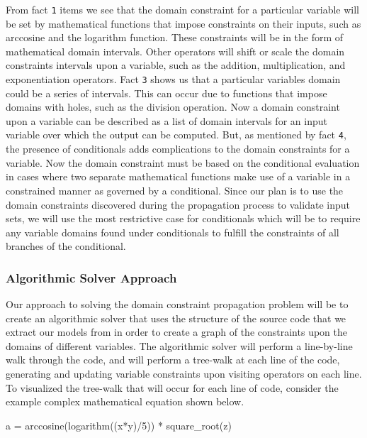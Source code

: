 \documentclass[article, 12pt, oneside]{memoir}
\newenvironment{Shaded}{}{}
\newcommand{\DecValTok}[1]{\textcolor[rgb]{0.25,0.63,0.44}{#1}}
\newcommand{\NormalTok}[1]{#1}
\newcommand{\OperatorTok}[1]{\textcolor[rgb]{0.40,0.40,0.40}{#1}}
\begin{document}
From fact \texttt{1} items we see that the domain constraint for a
particular variable will be set by mathematical functions that impose
constraints on their inputs, such as arccosine and the logarithm
function. These constraints will be in the form of mathematical domain
intervals. Other operators will shift or scale the domain constraints
intervals upon a variable, such as the addition, multiplication, and
exponentiation operators. Fact \texttt{3} shows us that a particular
variables domain could be a series of intervals. This can occur due to
functions that impose domains with holes, such as the division
operation. Now a domain constraint upon a variable can be described as a
list of domain intervals for an input variable over which the output can
be computed. But, as mentioned by fact \texttt{4}, the presence of
conditionals adds complications to the domain constraints for a
variable. Now the domain constraint must be based on the conditional
evaluation in cases where two separate mathematical functions make use
of a variable in a constrained manner as governed by a conditional.
Since our plan is to use the domain constraints discovered during the
propagation process to validate input sets, we will use the most
restrictive case for conditionals which will be to require any variable
domains found under conditionals to fulfill the constraints of all
branches of the conditional.

\hypertarget{algorithmic-solver-approach}{%
\subsubsection{Algorithmic Solver
Approach}\label{algorithmic-solver-approach}}

Our approach to solving the domain constraint propagation problem will
be to create an algorithmic solver that uses the structure of the source
code that we extract our models from in order to create a graph of the
constraints upon the domains of different variables. The algorithmic
solver will perform a line-by-line walk through the code, and will
perform a tree-walk at each line of the code, generating and updating
variable constraints upon visiting operators on each line. To visualized
the tree-walk that will occur for each line of code, consider the
example complex mathematical equation shown below.

\begin{Shaded}
\begin{Highlighting}[]
\NormalTok{a }\OperatorTok{=}\NormalTok{ arccosine(logarithm((x}\OperatorTok{*}\NormalTok{y)}\OperatorTok{/}\DecValTok{5}\NormalTok{)) }\OperatorTok{*}\NormalTok{ square_root(z)}
\end{Highlighting}
\end{Shaded}
\end{document}
